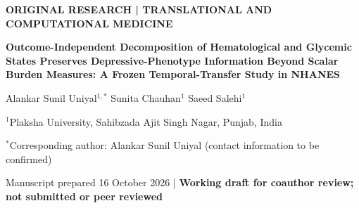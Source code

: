 \documentclass[11pt,a4paper]{article}
\begin{document}
\begin{center}
{\small\bfseries ORIGINAL RESEARCH \quad | \quad TRANSLATIONAL AND COMPUTATIONAL MEDICINE}\par\vspace{0.55em}
{\Large\bfseries Outcome-Independent Decomposition of Hematological and Glycemic States Preserves Depressive-Phenotype Information Beyond Scalar Burden Measures: A Frozen Temporal-Transfer Study in NHANES}\par\vspace{0.9em}
{\normalsize Alankar Sunil Uniyal$^{1,*}$ \quad Sunita Chauhan$^{1}$ \quad Saeed Salehi$^{1}$}\par\vspace{0.55em}
{\small $^{1}$Plaksha University, Sahibzada Ajit Singh Nagar, Punjab, India}\par
{\small $^{*}$Corresponding author: Alankar Sunil Uniyal (contact information to be confirmed)}\par\vspace{0.6em}
{\small Manuscript prepared 16 October 2026 \quad | \quad \textbf{Working draft for coauthor review; not submitted or peer reviewed}}\par
\end{center}
\vspace{0.4em}
\end{document}

